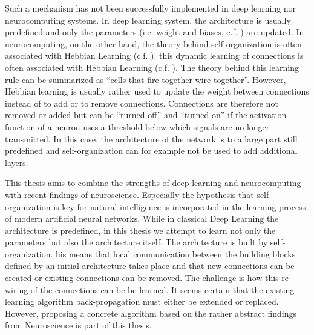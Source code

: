 Such a mechanism has not been successfully implemented in deep learning nor neurocomputing systems.
In deep learning system, the architecture is usually predefined and only the parameters (i.e. weight and biases, c.f. ) are updated.
In neurocomputing, on the other hand, the theory behind self-organization is often associated with Hebbian Learning (c.f. ).
this dynamic learning of connections is often associated with Hebbian Learning (c.f. ).
The theory behind this learning rule can be summarized as ``cells that fire together wire together''.
However, Hebbian learning is usually rather used to update the weight between connections instead of to add or to remove connections.
Connections are therefore not removed or added but can be ``turned off'' and ``turned on'' if the activation function of a neuron uses a threshold below which signals are no longer transmitted.
In this case, the architecture of the network is to a large part still predefined and self-organization can for example not be used to add additional layers.

This thesis aims to combine the strengths of deep learning and neurocomputing with recent findings of neuroscience.
Especially the hypothesis that self-organization is key for natural intelligence is incorporated in the learning process of modern artificial neural networks.
While in classical Deep Learning the architecture is predefined, in this thesis we attempt to learn not only the parameters but also the architecture itself.
The architecture is built by self-organization. 
his means that local communication between the building blocks defined by an initial architecture takes place and that new connections can be created or existing connections can be removed.
The challenge is how this re-wiring of the connections can be be learned.
It seems certain that the existing learning algorithm back-propagation must either be extended or replaced.
However, proposing a concrete algorithm based on the rather abstract findings from Neuroscience is part of this thesis.



